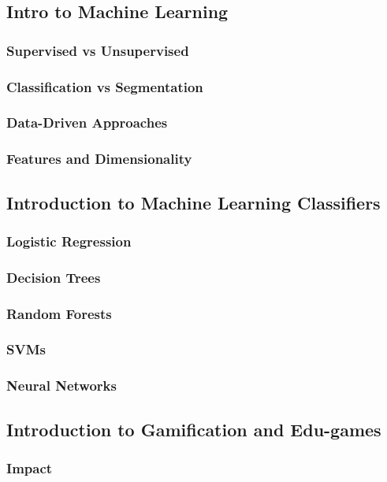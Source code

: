 \documentclass[a4paper,10pt]{article}
\begin{document}
\subsection{Intro to Machine Learning}
\subsubsection{Supervised vs Unsupervised}
\subsubsection{Classification vs Segmentation}
\subsubsection{Data-Driven Approaches}
\subsubsection{Features and Dimensionality}

\subsection{Introduction to Machine Learning Classifiers}
\subsubsection{Logistic Regression}
\subsubsection{Decision Trees}
\subsubsection{Random Forests}
\subsubsection{SVMs}
\subsubsection{Neural Networks}

\subsection{Introduction to Gamification and Edu-games}
\subsubsection{Impact}
\end{document}
